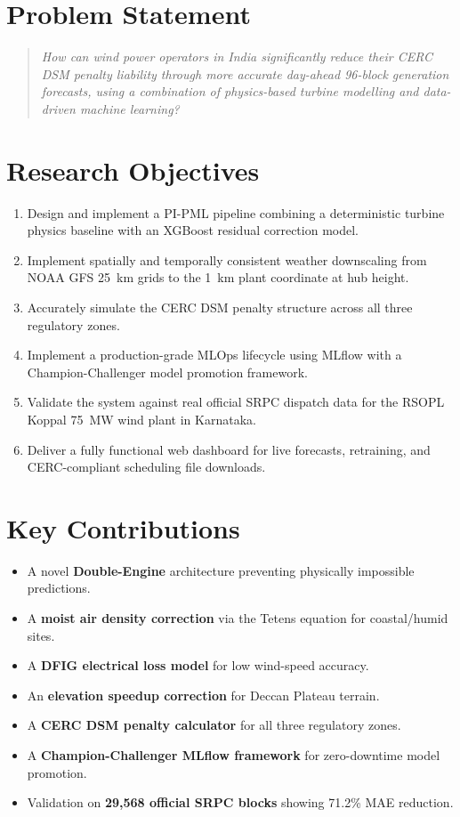 \documentclass[12pt,a4paper]{report}
\begin{document}
\section{Problem Statement}

\begin{quote}
\textit{How can wind power operators in India significantly reduce their CERC DSM penalty
liability through more accurate day-ahead 96-block generation forecasts, using a combination
of physics-based turbine modelling and data-driven machine learning?}
\end{quote}

\section{Research Objectives}

\begin{enumerate}
  \item Design and implement a PI-PML pipeline combining a deterministic turbine physics
        baseline with an XGBoost residual correction model.
  \item Implement spatially and temporally consistent weather downscaling from NOAA GFS
        25~km grids to the 1~km plant coordinate at hub height.
  \item Accurately simulate the CERC DSM penalty structure across all three regulatory zones.
  \item Implement a production-grade MLOps lifecycle using MLflow with a
        Champion-Challenger model promotion framework.
  \item Validate the system against real official SRPC dispatch data for the RSOPL Koppal
        75~MW wind plant in Karnataka.
  \item Deliver a fully functional web dashboard for live forecasts, retraining, and
        CERC-compliant scheduling file downloads.
\end{enumerate}

\section{Key Contributions}

\begin{itemize}
  \item A novel \textbf{Double-Engine} architecture preventing physically impossible predictions.
  \item A \textbf{moist air density correction} via the Tetens equation for coastal/humid sites.
  \item A \textbf{DFIG electrical loss model} for low wind-speed accuracy.
  \item An \textbf{elevation speedup correction} for Deccan Plateau terrain.
  \item A \textbf{CERC DSM penalty calculator} for all three regulatory zones.
  \item A \textbf{Champion-Challenger MLflow framework} for zero-downtime model promotion.
  \item Validation on \textbf{29,568 official SRPC blocks} showing 71.2\% MAE reduction.
\end{itemize}
\end{document}
